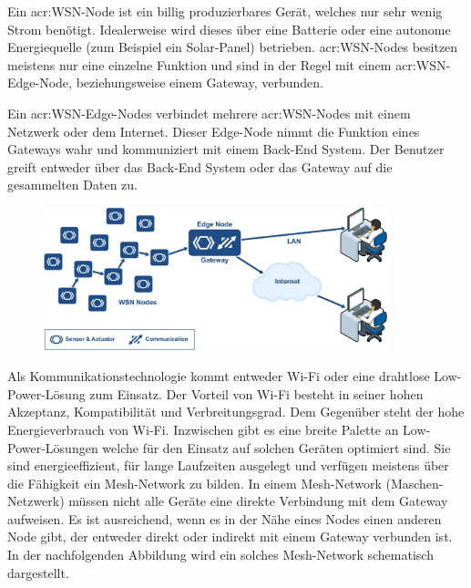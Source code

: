 Ein \gls{acr:WSN}-Node ist ein billig produzierbares Gerät, welches nur sehr wenig Strom benötigt. Idealerweise wird dieses über eine Batterie oder eine autonome Energiequelle (zum Beispiel ein Solar-Panel) betrieben. \gls{acr:WSN}-Nodes besitzen meistens nur eine einzelne Funktion und sind in der Regel mit einem \gls{acr:WSN}-Edge-Node, beziehungsweise einem Gateway, verbunden.

Ein \gls{acr:WSN}-Edge-Nodes verbindet mehrere \gls{acr:WSN}-Nodes mit einem Netzwerk oder dem Internet. Dieser Edge-Node nimmt die Funktion eines Gateways wahr und kommuniziert mit einem Back-End System. Der Benutzer greift entweder über das Back-End System oder das Gateway auf die gesammelten Daten zu.

\begin{figure}[!h]
  \centering
  \includegraphics[width=10cm]{./images/wireless-sensor-network}
\end{figure}


Als Kommunikationstechnologie kommt entweder Wi-Fi oder eine drahtlose Low-Power-Lösung zum Einsatz. Der Vorteil von Wi-Fi besteht in seiner hohen Akzeptanz, Kompatibilität und Verbreitungsgrad. Dem Gegenüber steht der hohe Energieverbrauch von Wi-Fi. Inzwischen gibt es eine breite Palette an Low-Power-Lösungen welche für den Einsatz auf solchen Geräten optimiert sind. Sie sind energieeffizient, für lange Laufzeiten ausgelegt und verfügen meistens über die Fähigkeit ein Mesh-Network zu bilden. In einem Mesh-Network (Maschen-Netzwerk) müssen nicht alle Geräte eine direkte Verbindung mit dem Gateway aufweisen. Es ist ausreichend, wenn es in der Nähe eines Nodes einen anderen Node gibt, der entweder direkt oder indirekt mit einem Gateway verbunden ist. In der nachfolgenden Abbildung wird ein solches Mesh-Network schematisch dargestellt.



